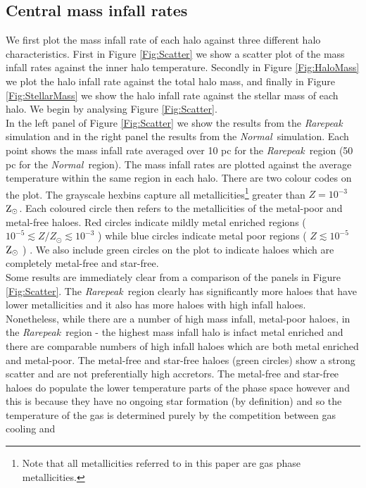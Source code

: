 \documentclass[graphics, twocolumn, usenatbib]{mn2e}
\newcommand{\zsolar} {$\rm{Z_{\odot}}~$}
\newcommand{\zsolarc} {$\rm{Z_{\odot}}$}
\newcommand{\rarepeak} {\textit{Rarepeak~}}
\newcommand{\normal} {\textit{Normal~}}
\begin{document}
\subsection{Central mass infall rates}
\indent We first plot the mass infall rate of each halo against three different halo
characteristics. First in Figure \ref{Fig:Scatter} we show a scatter plot of the mass infall rates
against the inner halo temperature. Secondly in Figure \ref{Fig:HaloMass} we plot the halo infall
rate against the total halo mass, and finally in Figure  \ref{Fig:StellarMass} we show the halo
infall rate against the stellar mass of each halo. We begin by analysing Figure \ref{Fig:Scatter}. \\
\indent In the left panel of Figure \ref{Fig:Scatter} we show the results from the \rarepeak
simulation and in the right panel the results from the \normal simulation. Each point shows the mass
infall rate averaged over 10 pc for the \rarepeak region (50 pc
for the \normal region). The mass infall rates are plotted against the average temperature within
the same region in each halo. There are two colour codes on the plot. The grayscale
hexbins capture all metallicities\footnote{Note that all metallicities
  referred to in this paper are gas phase metallicities.}
greater than $Z = 10^{-3}$ \zsolarc. Each coloured circle then refers to
the metallicities of the metal-poor and metal-free haloes. Red circles indicate
mildly metal enriched regions ( $10^{-5} \lesssim Z/Z_\odot \lesssim 10^{-3}$ )  while blue circles indicate
metal poor regions  ( $Z \lesssim 10^{-5}$ \zsolar ) . We also include green circles
on the plot to indicate haloes which are completely metal-free and star-free. \\
\indent Some results are immediately clear from a comparison of the panels in Figure
\ref{Fig:Scatter}. The \rarepeak region clearly has significantly more haloes that have lower
metallicities and it also has more haloes
with high infall haloes. Nonetheless, while there are a number of high mass infall,
metal-poor haloes, in the \rarepeak region - the highest mass infall halo is infact metal enriched
and there are comparable numbers of high infall haloes which are both metal enriched and metal-poor.
The metal-free and star-free haloes (green circles) show a strong scatter and are not preferentially
high accretors. The metal-free and star-free haloes do populate the lower temperature parts of the
phase space however and this is because they have no ongoing star formation (by definition) and so
the temperature of the gas is determined purely by the competition between gas cooling and
\end{document}
